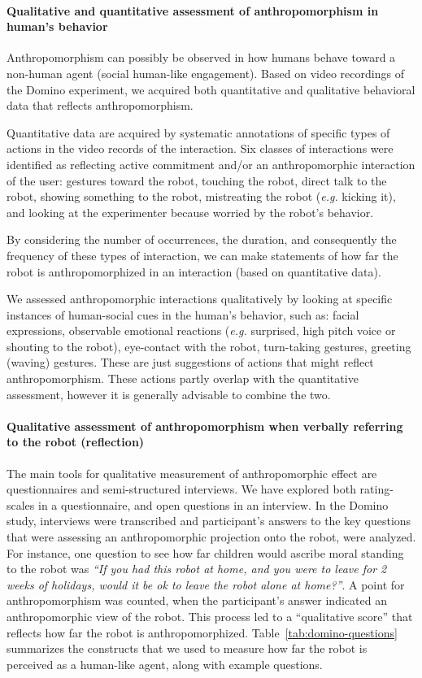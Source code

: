 \documentclass{frontiersSCNS} %
\newcommand{\eg}{\textit{e.g.}\xspace}
\begin{document}
\paragraph{Qualitative and quantitative assessment of anthropomorphism in
human's behavior\\}

Anthropomorphism can possibly be observed in how humans behave toward a
non-human agent (social human-like engagement). Based on video recordings of the
Domino experiment, we acquired both quantitative and qualitative behavioral data
that reflects anthropomorphism.

Quantitative data are acquired by systematic annotations of specific types of
actions in the video records of the interaction. Six classes of interactions
were identified as reflecting active commitment and/or an anthropomorphic
interaction of the user: gestures toward the robot, touching the robot, direct
talk to the robot, showing something to the robot, mistreating the robot (\eg
kicking it), and looking at the experimenter because worried by the robot's
behavior.

By considering the number of occurrences, the duration, and consequently the
frequency of these types of interaction, we can make statements of how far the
robot is anthropomorphized in an interaction (based on quantitative data).

We assessed anthropomorphic interactions qualitatively by looking at specific
instances of human-social cues in the human's behavior, such as: facial
expressions, observable emotional reactions (\eg surprised, high pitch voice or
shouting to the robot), eye-contact with the robot, turn-taking gestures,
greeting (waving) gestures. These are just suggestions of actions that might
reflect anthropomorphism. These actions partly overlap with the quantitative
assessment, however it is generally advisable to combine the two.


\paragraph{Qualitative assessment of anthropomorphism when verbally referring to
the robot (reflection)\\}

The main tools for qualitative measurement of anthropomorphic effect are
questionnaires and semi-structured interviews. We have explored both
rating-scales in a questionnaire, and open questions in an interview.  In the
Domino study, interviews were transcribed and participant's answers to the key
questions that were assessing an anthropomorphic projection onto the robot, were
analyzed. For instance, one question to see how far children would ascribe moral
standing to the robot was \emph{``If you had this robot at home, and you were to
leave for 2 weeks of holidays, would it be ok to leave the robot alone at
home?''}. A point for anthropomorphism was counted, when the participant's
answer indicated an anthropomorphic view of the robot. This process led to a
``qualitative score'' that reflects how far the robot is anthropomorphized.
Table~\ref{tab:domino-questions} summarizes the constructs that we used to
measure how far the robot is perceived as a human-like agent, along with example
questions.
\end{document}
